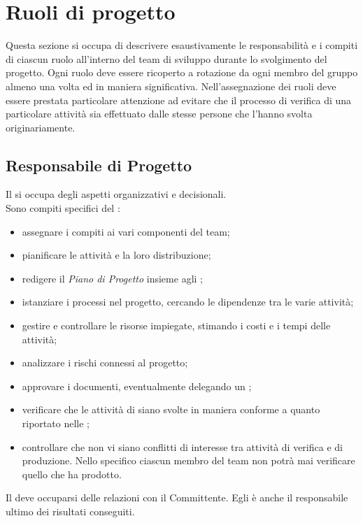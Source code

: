 \section{Ruoli di progetto}

Questa sezione si occupa di descrivere esaustivamente le responsabilità e i compiti di ciascun ruolo all'interno del team di sviluppo durante lo svolgimento del progetto.
Ogni ruolo deve essere ricoperto a rotazione da ogni membro del gruppo almeno una volta ed in maniera significativa. Nell'assegnazione dei ruoli deve essere prestata particolare attenzione ad evitare che il processo di verifica di una particolare attività sia effettuato dalle stesse persone che l'hanno svolta originariamente.


\subsection{Responsabile di Progetto} \label{sec:responsabile}
Il \Responsabile{} si occupa degli aspetti organizzativi e decisionali.\\
Sono compiti specifici del \Responsabile:
\begin{itemize}
	\item assegnare i compiti ai vari componenti del team;
	\item pianificare le attività e la loro distribuzione;
	\item redigere il \textit{Piano di Progetto} insieme agli \Amministratori;
	\item istanziare i processi nel progetto, cercando le dipendenze tra le varie attività;
	\item gestire e controllare le risorse impiegate, stimando i costi e i tempi delle attività;
	\item analizzare i rischi connessi al progetto;
	\item approvare i documenti, eventualmente delegando un \Verificatore;
	\item verificare che le attività di \VV{} siano svolte in maniera conforme a quanto riportato nelle \NormeDiProgetto;
	\item controllare che non vi siano conflitti di interesse tra attività di verifica e di produzione. Nello specifico ciascun membro del team non potrà mai verificare quello che ha prodotto.
\end{itemize}
Il \Responsabile{} deve occuparsi delle relazioni con il Committente.
Egli è anche il responsabile ultimo dei risultati conseguiti.


